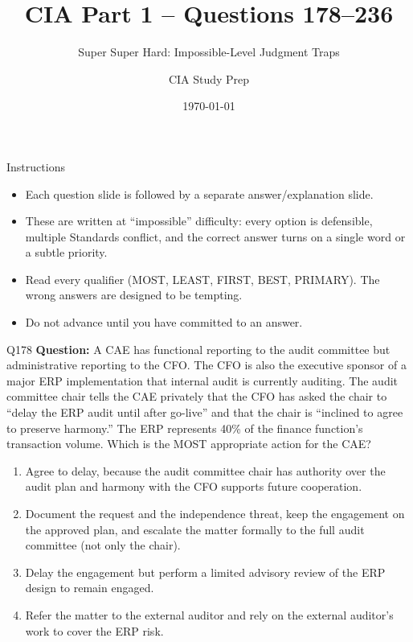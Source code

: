 \documentclass[aspectratio=169,10pt]{beamer}
\title{CIA Part 1 -- Questions 178--236}
\subtitle{Super Super Hard: Impossible-Level Judgment Traps}
\author{CIA Study Prep}
\date{\today}
\begin{document}
	
	\begin{frame}
		\titlepage
	\end{frame}
	
	\begin{frame}{Instructions}
		\begin{itemize}
			\item Each question slide is followed by a separate answer/explanation slide.
			\item These are written at ``impossible'' difficulty: every option is defensible, multiple Standards conflict, and the correct answer turns on a single word or a subtle priority.
			\item Read every qualifier (MOST, LEAST, FIRST, BEST, PRIMARY). The wrong answers are designed to be tempting.
			\item Do not advance until you have committed to an answer.
		\end{itemize}
	\end{frame}
	
	\begin{frame}[t]{Q178}
		\small
		\textbf{Question:} A CAE has functional reporting to the audit committee but administrative reporting to the CFO. The CFO is also the executive sponsor of a major ERP implementation that internal audit is currently auditing. The audit committee chair tells the CAE privately that the CFO has asked the chair to ``delay the ERP audit until after go-live'' and that the chair is ``inclined to agree to preserve harmony.'' The ERP represents 40\% of the finance function's transaction volume. Which is the MOST appropriate action for the CAE?
		\begin{enumerate}[label=\Alph*.,itemsep=1pt,topsep=2pt]
			\item Agree to delay, because the audit committee chair has authority over the audit plan and harmony with the CFO supports future cooperation.
			\item Document the request and the independence threat, keep the engagement on the approved plan, and escalate the matter formally to the full audit committee (not only the chair).
			\item Delay the engagement but perform a limited advisory review of the ERP design to remain engaged.
			\item Refer the matter to the external auditor and rely on the external auditor's work to cover the ERP risk.
		\end{enumerate}
	\end{frame}
	
\end{document}
